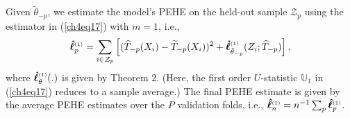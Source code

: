 \documentclass [PhD] {uclathes}
\begin{document}
Given \mbox{\footnotesize $\tilde{\theta}_{-p}$}, we estimate the model's PEHE on the held-out sample \mbox{\footnotesize $\mathcal{Z}_p$} using the estimator in (\ref{ch4eq17}) with \mbox{\footnotesize $m = 1$}, i.e.,
\begin{align}  
\boldsymbol{\hat{\ell}}^{\mbox{\tiny $(1)$}}_p = \sum_{i \in \mathcal{Z}_p}\left[(\widehat{T}_{-p}(X_i)-\widetilde{T}_{-p}(X_i))^2+\boldsymbol{\dot{\ell}}^{\mbox{\tiny $(1)$}}_{\tilde{\theta}_{-p}}(Z_i;\widehat{T}_{-p})\right], \nonumber
\end{align} 
where \mbox{\footnotesize $\boldsymbol{\dot{\ell}}^{\mbox{\tiny $(1)$}}_{\theta}(.)$} is given by Theorem 2. (Here, the first order \mbox{\footnotesize $U$}-statistic \mbox{\footnotesize $\mathbb{U}_1$} in (\ref{ch4eq17}) reduces to a sample average.) The final PEHE estimate is given by the average PEHE estimates over the \mbox{\footnotesize $P$} validation folds, i.e., \mbox{\footnotesize $\boldsymbol{\hat{\ell}}^{\mbox{\tiny $(1)$}}_n = n^{-1}\sum_{p}\boldsymbol{\hat{\ell}}^{\mbox{\tiny $(1)$}}_p$}.\\ 
\end{document}
